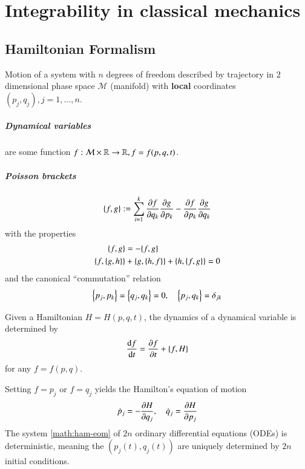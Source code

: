 \chapter{Integrability in classical mechanics}
\section{Hamiltonian Formalism}
Motion of a system with $n$ degrees of freedom described by trajectory in $2$ dimensional phase space $\mathcal{M}$ (manifold) with \textbf{local} coordinates $(p_j, q_j), j=1,\dots, n$.

\paragraph{Dynamical variables} are some function $f: \mathcal{M}\times \mathbb{R} \rightarrow \mathbb{R}, f=f(p, q, t)$.

\paragraph{Poisson brackets}
\begin{equation}
	\left\{f, g  \right\} := \sum_{i=1}^{k} \pdv{f}{q_k} \pdv{g}{p_k} - \pdv{f}{p_k}\pdv{g}{q_k}
\end{equation}
with the properties
\begin{align*}
	\pb{f}{g} &= - \pb{f}{g}  \\
	\pb{f}{\pb{g}{h}} &+ \pb{g}{\pb{h}{f}} + \pb{h}{\pb{f}{g}}  = 0
	\label{eq:}
\end{align*}
and the canonical ``commutation'' relation
\begin{equation*}
	\pb{p_j}{p_k} 	 = \pb{q_j}{q_k}  = 0, \quad \pb{p_j}{q_k}  = \delta_{jk}
\end{equation*}

Given a Hamiltonian $H = H(p, q, t)$, the dynamics of a dynamical variable is determined by 
\begin{equation*}
	\dv{f}{t} = \pdv{f}{t} + \pb{f}{H}	
\end{equation*}
for any $f = f(p, q)$.

Setting $f=p_j$ or $f=q_j$ yields the Hamilton's equation of motion
\begin{equation}
	\dot{p}_j = - \pdv{H}{q_j}, \quad \dot{q}_j = \pdv{H}{p_j}
	\label{math:ham-eom}
\end{equation}
The system \eqref{math:ham-eom} of $2n$ ordinary differential equations (ODEs) is deterministic, meaning the $(p_j(t), q_j(t))$ are uniquely determined by $2n$ initial conditions.

